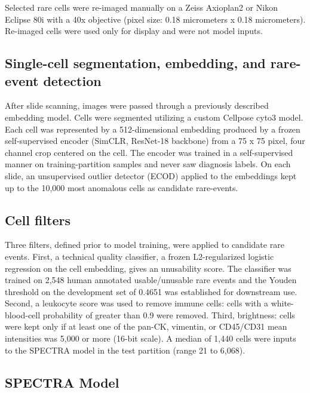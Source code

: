 \documentclass[11pt]{article}
\begin{document}
Selected rare cells were re-imaged manually on a Zeiss Axioplan2 or Nikon Eclipse 80i with a 40x objective (pixel size: 0.18 micrometers x 0.18 micrometers). Re-imaged cells were used only for display and were not model inputs.

\subsection*{Single-cell segmentation, embedding, and rare-event detection}

After slide scanning, images were passed through a previously described embedding model. Cells were segmented utilizing a custom Cellpose cyto3 model\cite{naghdloo2025blue,stringer2021,stringer2025}. Each cell was represented by a 512-dimensional embedding produced by a frozen self-supervised encoder (SimCLR, ResNet-18 backbone)\cite{chen2020,he2016} from a 75 x 75 pixel, four channel crop centered on the cell\cite{naghdloo2025blue}. The encoder was trained in a self-supervised manner on training-partition samples and never saw diagnosis labels. On each slide, an unsupervised outlier detector (ECOD) applied to the embeddings kept up to the 10,000 most anomalous cells as candidate rare-events\cite{murgoitio2025,naghdloo2025blue,li2023}.

\subsection*{Cell filters}

Three filters, defined prior to model training, were applied to candidate rare events. First, a technical quality classifier, a frozen L2-regularized logistic regression on the cell embedding, gives an unusability score. The classifier was trained on 2,548 human annotated usable/unusable rare events and the Youden threshold\cite{youden1950} on the development set of 0.4651 was established for downstream use. Second, a leukocyte score was used to remove immune cells: cells with a white-blood-cell probability of greater than 0.9 were removed. Third, brightness: cells were kept only if at least one of the pan-CK, vimentin, or CD45/CD31 mean intensities was 5,000 or more (16-bit scale). A median of 1,440 cells were inputs to the SPECTRA model in the test partition (range 21 to 6,068).

\subsection*{SPECTRA Model}
\end{document}
